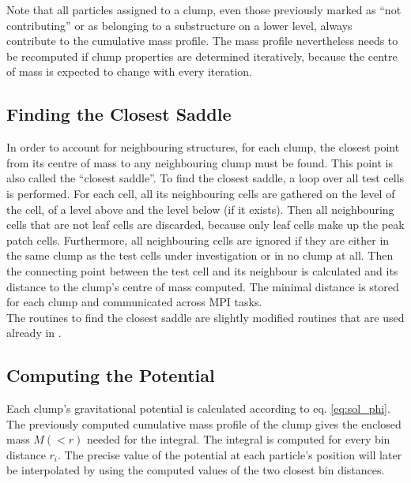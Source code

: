 Note that all particles assigned to a clump, even those previously marked as ``not contributing'' or as belonging to a substructure on a lower level, always contribute to the cumulative mass profile. 
The mass profile nevertheless needs to be recomputed if clump properties are determined iteratively, because the centre of mass is expected to change with every iteration.













\subsection{Finding the Closest Saddle}

In order to account for neighbouring structures, for each clump, the closest point from its centre of mass to any neighbouring clump must be found.
This point is also called the ``closest saddle''.
To find the closest saddle, a loop over all test cells is performed.
For each cell, all its neighbouring cells are gathered on the level of the cell, of a level above and the level below (if it exists). 
Then all neighbouring cells that are not leaf cells are discarded, because only leaf cells make up the peak patch cells.
Furthermore, all neighbouring cells are ignored if they are either in the same clump as the test cells under investigation or in no clump at all.
Then the connecting point between the test cell and its neighbour is calculated and its distance to the clump's centre of mass computed.
The minimal distance is stored for each clump and communicated across MPI tasks.\\
The routines to find the closest saddle are slightly modified routines that  are used already in \phew.








\subsection{Computing the Potential}
Each clump's gravitational potential is calculated according to eq. \eqref{eq:sol_phi}.
The previously computed cumulative mass profile of the clump gives the enclosed mass $M(<r)$ needed for the integral.
The integral is computed for every bin distance $r_i$.
The precise value of the potential at each particle's position will later be interpolated by using the computed values of the two closest bin distances.

